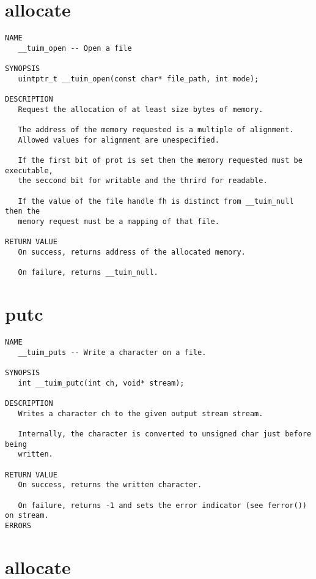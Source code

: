 \documentclass[
   12pt,                         %
   openright,                    %
   twoside,                      %
   a4paper,                      %
   sumario = tradicional,        %
   english,                      %
   xcolor=table                  %
]{abntex2}
\begin{document}
\section{allocate}

\begin{verbatim}
NAME
   __tuim_open -- Open a file

SYNOPSIS
   uintptr_t __tuim_open(const char* file_path, int mode);

DESCRIPTION
   Request the allocation of at least size bytes of memory.

   The address of the memory requested is a multiple of alignment.
   Allowed values for alignment are unespecified.

   If the first bit of prot is set then the memory requested must be executable,
   the seccond bit for writable and the thrird for readable.

   If the value of the file handle fh is distinct from __tuim_null then the
   memory request must be a mapping of that file.

RETURN VALUE
   On success, returns address of the allocated memory.

   On failure, returns __tuim_null.
\end{verbatim}

\newpage
\section{putc}

\begin{verbatim}
NAME
   __tuim_puts -- Write a character on a file.

SYNOPSIS
   int __tuim_putc(int ch, void* stream);

DESCRIPTION
   Writes a character ch to the given output stream stream.

   Internally, the character is converted to unsigned char just before being
   written.

RETURN VALUE
   On success, returns the written character.

   On failure, returns -1 and sets the error indicator (see ferror()) on stream. 
ERRORS
\end{verbatim}

\newpage
\section{allocate}
\end{document}

